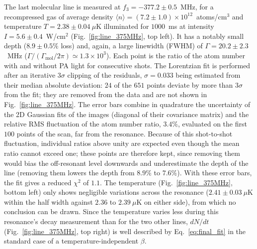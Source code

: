 The last molecular line is measured at $f_3=-377.2\pm0.5$~MHz, for a
recompressed gas of average density $\langle n\rangle = (7.2\pm1.0)\times10^{12}$~atoms/cm$^3$
and temperature $T=2.38\pm0.04~\mu$K illuminated for $1000$~ms at intensity $I=5.6\pm0.4$~W/cm$^2$
(Fig.~\ref{fig:line_375MHz}, top left). It has a notably small depth ($8.9\pm0.5\%$
loss) and, again, a large linewidth (FWHM) of $\Gamma=20.2\pm2.3$~MHz
($\Gamma/(\Gamma_{\text{mol}}/2\pi) \simeq 1.3\times10^3$). Each point is the ratio of
the atom number with and without PA light for consecutive shots. The Lorentzian fit is
performed after an iterative $3\sigma$ clipping of the residuals, $\sigma = 0.033$ being
estimated from their median absolute deviation: $24$ of the $651$ points deviate by more
than $3\sigma$ from the fit; they are removed from the data and are not shown in
Fig.~\ref{fig:line_375MHz}. The error bars combine in quadrature the uncertainty of the
2D Gaussian fits of the images (diagonal of their covariance matrix) and the relative
RMS fluctuation of the atom number ratio, $3.4\%$, evaluated on the first $100$ points
of the scan, far from the resonance. Because of this shot-to-shot fluctuation, individual
ratios above unity are expected even though the mean ratio cannot exceed one; these points
are therefore kept, since removing them would bias the off-resonant level downwards and
underestimate the depth of the line (removing them lowers the depth from $8.9\%$ to
$7.6\%$). With these error bars, the fit gives a reduced $\chi^2$ of $1.1$.
The temperature (Fig.~\ref{fig:line_375MHz}, bottom left) only shows negligible variations
across the resonance ($2.41\pm0.03~\mu$K within the half width against $2.36$ to
$2.39~\mu$K on either side), from which no conclusion can be drawn. Since the temperature
varies less during this resonance's decay measurement than for the two other lines, $dN/dt$ (Fig.~\ref{fig:line_375MHz}, top right) is well
described by Eq.~\ref{eq:final_fit} in the standard case of a temperature-independent
$\beta$. 

